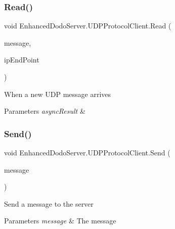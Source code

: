 \subsubsection{\texorpdfstring{Read()}{Read()}}
{\footnotesize\ttfamily void Enhanced\+Dodo\+Server.\+U\+D\+P\+Protocol\+Client.\+Read (\begin{DoxyParamCaption}\item[{string}]{message,  }\item[{I\+P\+End\+Point}]{ip\+End\+Point }\end{DoxyParamCaption})}



When a new U\+DP message arrives 


\begin{DoxyParams}{Parameters}
{\em async\+Result} & \\
\hline
\end{DoxyParams}
\mbox{\label{class_enhanced_dodo_server_1_1_u_d_p_protocol_client_a1244ef98c96f878d8f749267359d3462}} 
\subsubsection{\texorpdfstring{Send()}{Send()}}
{\footnotesize\ttfamily void Enhanced\+Dodo\+Server.\+U\+D\+P\+Protocol\+Client.\+Send (\begin{DoxyParamCaption}\item[{string}]{message }\end{DoxyParamCaption})}



Send a message to the server 


\begin{DoxyParams}{Parameters}
{\em message} & The message\\
\hline
\end{DoxyParams}
\mbox{\label{class_enhanced_dodo_server_1_1_u_d_p_protocol_client_a7e51c05ccc4f89a74fa293eebd1bde75}} 
